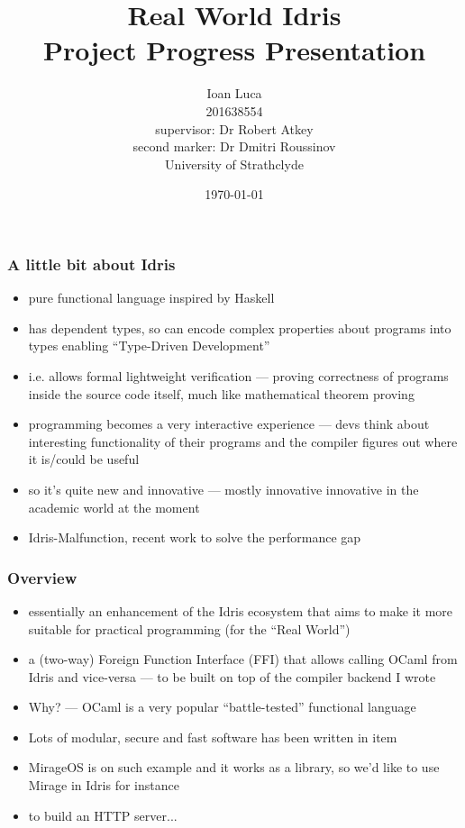 \documentclass{beamer}
\title{Real World Idris \\ Project Progress Presentation}
\author{Ioan Luca \\ 201638554 \\ \small supervisor: Dr Robert Atkey \\
	\small second marker: Dr Dmitri Roussinov \\
	\small University of Strathclyde} %
\date{\today}
\begin{document}
\frame{\titlepage}


\begin{frame}
	\frametitle{A little bit about Idris}
	\begin{itemize}
		\item pure functional language inspired by Haskell
		\item has dependent types, so can encode complex properties
		      about programs into types enabling ``Type-Driven Development''
		\item i.e. allows formal lightweight verification --- proving
		      correctness of programs inside the source code itself,
		      much like mathematical theorem proving
		\item programming becomes a very interactive experience
		      --- devs think about interesting functionality of their programs
		      and the compiler figures out where it is/could be useful
		\item so it's quite new and innovative --- mostly innovative innovative
		      in the academic world at the moment
		\item Idris-Malfunction, recent work to solve the performance gap
	\end{itemize}
\end{frame}


\begin{frame}
	\frametitle{Overview}

	\begin{itemize}
		\item essentially an enhancement of the Idris ecosystem
		      that aims to make it more suitable for practical
		      programming (for the ``Real World'')
		\item a (two-way) Foreign Function Interface (FFI) that
		      allows calling OCaml
		      from Idris and vice-versa --- to be built on top of the
		      compiler backend I wrote
		\item Why? --- OCaml is a very popular ``battle-tested''
		      functional language
		\item Lots of modular, secure and fast software has been written in item
		\item MirageOS is on such example and it works as a library, so we'd
		      like to use Mirage in Idris for instance
		\item to build an HTTP server...
	\end{itemize}
\end{frame}
\end{document}
